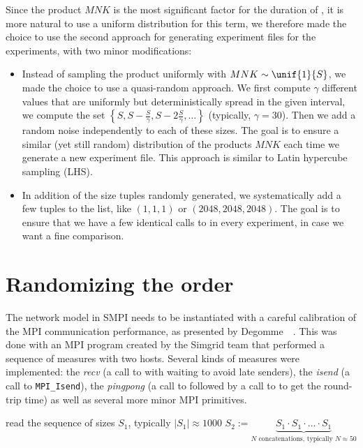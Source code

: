             Since the product \(MNK\) is the most significant factor for the duration of \dgemm, it is more natural to
            use a uniform distribution for this term, we therefore made the choice to use the second approach for
            generating experiment files for the \dgemm experiments, with two minor modifications:
            \begin{itemize}
                \item Instead of sampling the product uniformly with \(MNK\sim\unif{1}{S}\), we made the choice to use a
                    quasi-random approach. We first compute $\gamma$ different values that are uniformly
                    but deterministically spread in the given interval, \ie we compute the set
                    \(\left\{S, S-\frac{S}{\gamma},S-2\frac{S}{\gamma}, \dots\right\}\)
                    (typically, \(\gamma=30\)). Then we add a random noise independently to each of these sizes. The
                    goal is to ensure a similar (yet still random) distribution of the products \(MNK\) each time we
                    generate a new experiment file. This approach is similar to Latin hypercube sampling (LHS).
                \item In addition of the size tuples randomly generated, we systematically add a few tuples to the list,
                    like \((1,1,1)\) or \((2048,2048,2048)\). The goal is to ensure that we have a few identical calls to
                    \dgemm in every experiment, in case we want a fine comparison.
            \end{itemize}

    \section{Randomizing the order}%
    \label{sec:randomizing_order}
        The network model in SMPI needs to be instantiated with a careful calibration of the MPI communication
        performance, as presented by Degomme~\etal~\cite{smpi}. This was done with an MPI program created by the Simgrid
        team that performed a sequence of measures with two hosts. Several kinds of measures were implemented: the
        \emph{recv} (a call to \recv with waiting to avoid late senders), the \emph{isend} (a call to
        \texttt{MPI\_Isend}), the \emph{pingpong} (a call to \send followed by a call to \recv to get the round-trip
        time) as well as several more minor MPI primitives.

        \begin{algorithm}[H]
            read the sequence of sizes \(S_1\), typically \(|S_1| \approx 1000\)\;
            \(S_2 := \underbrace{S_1\cdot S_1\cdot\dots\cdot S_1}_{N\text{ concatenations, typically } N\approx 50}\)\;
        \end{algorithm}

